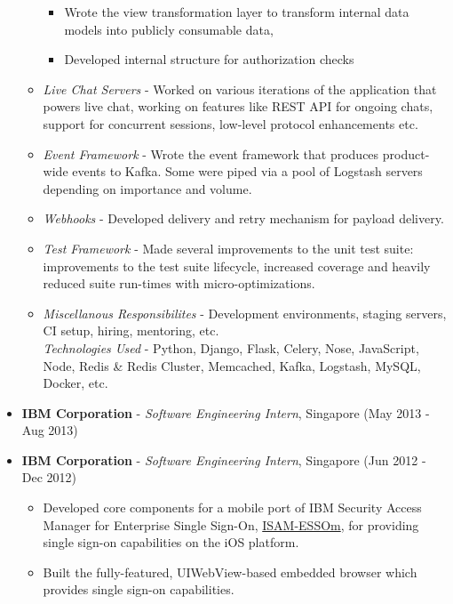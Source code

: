 \begin{itemize}
\begin{itemize}
    \begin{itemize}
    \tightlist
    \item
      Wrote the view transformation layer to transform internal data
      models into publicly consumable data,
    \item
      Developed internal structure for authorization checks
    \end{itemize}
  \item
    \emph{Live Chat Servers} - Worked on various iterations of the
    application that powers live chat, working on features like REST API
    for ongoing chats, support for concurrent sessions, low-level
    protocol enhancements etc.
  \item
    \emph{Event Framework} - Wrote the event framework that produces
    product-wide events to Kafka. Some were piped via a pool of Logstash
    servers depending on importance and volume.
  \item
    \emph{Webhooks} - Developed delivery and retry mechanism for payload
    delivery.
  \item
    \emph{Test Framework} - Made several improvements to the unit test
    suite: improvements to the test suite lifecycle, increased coverage
    and heavily reduced suite run-times with micro-optimizations.
  \item
    \emph{Miscellanous Responsibilites} - Development environments,
    staging servers, CI setup, hiring, mentoring, etc.\\
    \emph{Technologies Used} - Python, Django, Flask, Celery, Nose,
    JavaScript, Node, Redis \& Redis Cluster, Memcached, Kafka,
    Logstash, MySQL, Docker, etc.
  \end{itemize}
\item
  \textbf{IBM Corporation} - \emph{Software Engineering Intern},
  Singapore \hfill (May 2013 - Aug 2013)
\item
  \textbf{IBM Corporation} - \emph{Software Engineering Intern},
  Singapore \hfill (Jun 2012 - Dec 2012)

  \begin{itemize}
  \tightlist
  \item
    Developed core components for a mobile port of IBM Security Access
    Manager for Enterprise Single Sign-On,
    \href{https://itunes.apple.com/us/app/isam-essom/id741972716?mt=8}{ISAM-ESSOm},
    for providing single sign-on capabilities on the iOS platform.
  \item
    Built the fully-featured, UIWebView-based embedded browser which
    provides single sign-on capabilities.
  \end{itemize}
\end{itemize}

